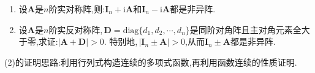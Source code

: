 \documentclass[../../main.tex]{subfiles}
\begin{document}
\begin{proposition}\label{proposition:实对称与实反称矩阵性质}
\begin{enumerate}[(1)]
\item 设\(\boldsymbol{A}\)是\(n\)阶实对称阵,则:\(\boldsymbol{I}_n + \mathrm{i}\boldsymbol{A}\)和\(\boldsymbol{I}_n - \mathrm{i}\boldsymbol{A}\)都是非异阵.

\item 设\(\boldsymbol{A}\)是\(n\)阶实反对称阵,\(\,\boldsymbol{D}=\mathrm{diag}\{d_1,d_2,\cdots,d_n\}\)是同阶对角阵且主对角元素全大于零,求证:\(|\boldsymbol{A}+\boldsymbol{D}|>0\). 特别地,\(\,|\boldsymbol{I}_n\pm\boldsymbol{A}|>0\),从而\(\boldsymbol{I}_n\pm\boldsymbol{A}\)都是非异阵.
\end{enumerate}
\end{proposition}
\begin{note}
(2)的证明思路:利用行列式构造连续的多项式函数,再利用函数连续的性质证明.
\end{note}
\end{document}
